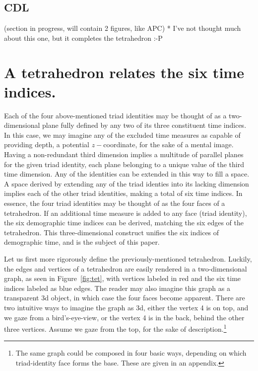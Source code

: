\documentclass[12pt,oneside,letter]{article} %
\newcommand\tgh[1]{\raisebox{-.25\height}{\texttt{[image: Figures/triadtable/triad\#1.pdf]}}}
\begin{document}
\FloatBarrier
\subsection*{CDL}%
\FloatBarrier
(section in progress, will contain 2 figures, like APC)
* I've not thought much about this one, but it completes the tetrahedron :-P


\section*{A tetrahedron relates the six time indices.}
Each of the four above-mentioned triad identities may be thought of as a
two-dimensional plane fully defined by any two of its three constituent time
indices.
In this case, we may imagine any of the excluded time measures as capable of
providing depth, a potential $z-$coordinate, for the sake of a mental image.
Having a non-redundant third dimension implies a multitude of parallel planes
for the given triad identity, each plane belonging to a unique value of the
third time dimension. Any of the identities can be extended in this way to fill a space. A space derived by
extending any of the triad identies into its lacking dimension implies each of the
other triad identities, making a total of six time indices. In essence, the
four triad identities may be thought of as the four faces of a
tetrahedron. If an additional time measure is added to any face (triad
identity), the six demographic time indices can be derived, matching the six edges of the tetrahedron. This three-dimensional construct unifies the six indices of demographic time, and is the subject of this paper.

Let us first more rigorously define the previously-mentioned tetrahedron.
Luckily, the edges and vertices of a tetrahedron are easily rendered in a
two-dimensional graph, as seen in Figure~\ref{fig:tet}, with vertices labeled
in red and the six time indices labeled as blue edges. The reader may also imagine this graph as a transparent 3d object, in which case the four faces become apparent. There
are two intuitive ways to imagine the graph as 3d, either the vertex 4 is on top, and we gaze from a bird's-eye-view, or the vertex 4 is in the back, behind the other three vertices. Assume we
gaze from the top, for the sake of description.\footnote{The same graph
could be composed in four basic ways, depending on which triad-identity face
forms the base.
These are given in an appendix.} 
\end{document}
